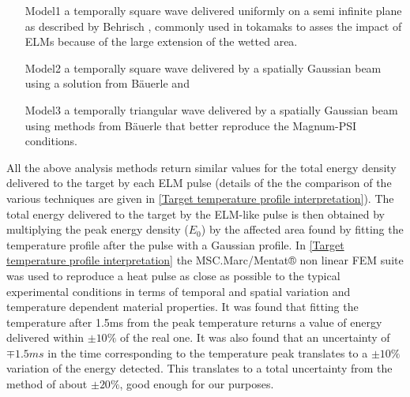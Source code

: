 \begin{itemize}
    \item[Model1] a temporally square wave delivered uniformly on a semi infinite plane as described by Behrisch \cite{Behrisch1980}, commonly used in tokamaks to asses the impact of ELMs because of the large extension of the wetted area.
    \item[Model2] a temporally square wave delivered by a spatially Gaussian beam using a solution from Bäuerle \cite{Bauerle2011,Yu2016} and
    \item[Model3] a temporally triangular wave delivered by a spatially Gaussian beam using methods from Bäuerle that better reproduce the Magnum-PSI conditions.
\end{itemize}
All the above analysis methods return similar values for the total energy density delivered to the target by each ELM pulse (details of the the comparison of the various techniques are given in \autoref{Target temperature profile interpretation}). The total energy delivered to the target by the ELM-like pulse is then obtained by multiplying the peak energy density ($E_0$) by the affected area found by fitting the temperature profile after the pulse with a Gaussian profile. In \autoref{Target temperature profile interpretation} the MSC.Marc/Mentat® non linear FEM suite was used to reproduce a heat pulse as close as possible to the typical experimental conditions in terms of temporal and spatial variation and temperature dependent material properties. It was found that fitting the temperature after 1.5ms from the peak temperature returns a value of energy delivered within $\pm10\%$ of the real one. It was also found that an uncertainty of $\mp1.5ms$ in the time corresponding to the temperature peak translates to a $\pm10\%$ variation of the energy detected. This translates to a total uncertainty from the method of about $\pm20\%$, good enough for our purposes.

